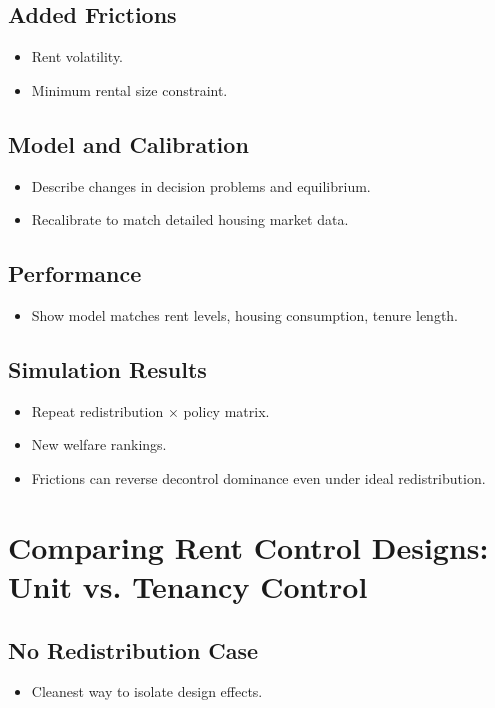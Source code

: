 \documentclass[11pt]{article}
\begin{document}
\subsection{Added Frictions}
\begin{itemize}[leftmargin=*]
    \item Rent volatility.
    \item Minimum rental size constraint.
\end{itemize}

\subsection{Model and Calibration}
\begin{itemize}[leftmargin=*]
    \item Describe changes in decision problems and equilibrium.
    \item Recalibrate to match detailed housing market data.
\end{itemize}

\subsection{Performance}
\begin{itemize}[leftmargin=*]
    \item Show model matches rent levels, housing consumption, tenure length.
\end{itemize}

\subsection{Simulation Results}
\begin{itemize}[leftmargin=*]
    \item Repeat redistribution × policy matrix.
    \item New welfare rankings.
    \item Frictions can reverse decontrol dominance even under ideal redistribution.
\end{itemize}

\section{Comparing Rent Control Designs: Unit vs. Tenancy Control}

\subsection{No Redistribution Case}
\begin{itemize}[leftmargin=*]
    \item Cleanest way to isolate design effects.
\end{itemize}
\end{document}
